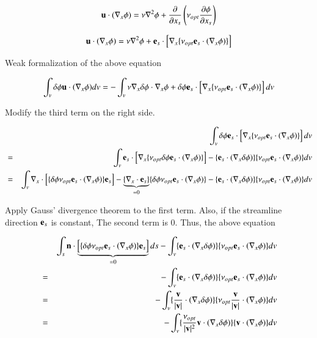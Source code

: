 \begin{equation}
 {\mathbf{u}}\cdot(\nabla_x\phi) = \nu \nabla^2\phi + \frac{\partial}{\partial x_s} \left( \nu_{opt} \frac{\partial\phi}{\partial x_s}\right)
\end{equation}


\begin{equation}
{\mathbf{u}}\cdot(\nabla_x\phi) = \nu \nabla^2 \phi + {\mathbf{e}_s} \cdot \left[ \nabla_x \{\nu_{opt}{\mathbf{e}_s}\cdot (\nabla_x\phi)\}\right]
\end{equation}

Weak formalization of the above equation

\begin{equation}
\int_v {\delta\phi}{\mathbf{u}}\cdot(\nabla_x\phi) dv = -\int_v \nu \nabla_x{\delta\phi} \cdot \nabla_x\phi + {\delta\phi}{\mathbf{e}_s} \cdot \left[ \nabla_x\{\nu_{opt}{\mathbf{e}_s}\cdot(\nabla_x\phi)\}\right] dv
\end{equation}

Modify the third term on the right side.

\begin{eqnarray}
&&\int_v \delta\phi{\mathbf{e}_s} \cdot \left[ \nabla_x\{\nu_{opt}{\mathbf{e}_s}\cdot(\nabla_x\phi)\} \right] dv\\
&=& \int_v {\mathbf{e}_s} \cdot \left[ \nabla_x \{ \nu_{opt}{\delta\phi}{\mathbf{e}_s}\cdot(\nabla_x\phi)\} \right] - \{{\mathbf{e}_s}\cdot(\nabla_x{\delta\phi})\} \{\nu_{opt}{\mathbf{e}_s}\cdot(\nabla_x\phi)\} dv\\
&=& \int_v \nabla_x \cdot \left[ \{{\delta\phi}\nu_{opt}{\mathbf{e}_s}\cdot(\nabla_x\phi)\} {\mathbf{e}_s}\right] - \underbrace{\left\{\nabla_x \cdot {\mathbf{e}_s}\right\}}_{=0} \{{\delta\phi}\nu_{opt}{\mathbf{e}_s}\cdot(\nabla_x\phi)\} - \{{\mathbf{e}_s}\cdot(\nabla_x{\delta\phi})\} \{\nu_{opt}{\mathbf{e}_s}\cdot(\nabla_x\phi)\} dv
\end{eqnarray}

Apply Gauss' divergence theorem to the first term.
%
Also, if the streamline direction $\mathbf{e}_s$ is constant, The second term is $0$. 
%
Thus, the above equation

\begin{eqnarray}
&&\int_s{\mathbf{n}}\cdot\underbrace{\left[ \{{\delta\phi}\nu_{opt}{\mathbf{e}_s}\cdot(\nabla_x\phi)\}{\mathbf{e}_s} \right]}_{=0}ds 	- \int_v\{{\mathbf{e}_s}\cdot(\nabla_x{\delta\phi})\}\{{\nu_{opt}}{\mathbf{e}_s}\cdot(\nabla_x\phi)\} dv\\
&=& -\int_v\{{\mathbf{e}_s}\cdot(\nabla_x{\delta\phi})\} \{{\nu_{opt}}{\mathbf{e}_s}\cdot(\nabla_x\phi)\} dv\\
&=& -\int_v\{\frac{\mathbf{v}}{|\mathbf{v}|}\cdot(\nabla_x{\delta\phi})\} \{{\nu_{opt}}\frac{\mathbf{v}}{|\mathbf{v}|}\cdot(\nabla_x\phi)\} dv\\
&=& -\int_v\{\frac{\nu_{opt}}{|\mathbf{v}|^2}{\mathbf{v}}\cdot(\nabla_x{\delta\phi})\} \{{\mathbf{v}}\cdot(\nabla_x\phi)\} dv
\end{eqnarray}

